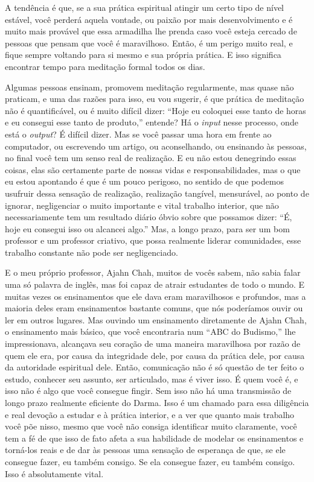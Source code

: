 A tendência é que, se a sua prática espiritual atingir um certo tipo
de nível estável, você perderá aquela vontade, ou paixão por mais
desenvolvimento e é muito mais provável que essa armadilha lhe prenda
caso você esteja cercado de pessoas que pensam que você é maravilhoso.
Então, é um perigo muito real, e fique sempre voltando para si mesmo e
sua própria prática. E isso significa encontrar tempo para meditação
formal todos os dias. 

Algumas pessoas ensinam, promovem meditação regularmente, mas quase
não praticam, e uma das razões para isso, eu vou sugerir, é que prática
de meditação não é quantificável, ou é muito difícil dizer: “Hoje eu
coloquei esse tanto de horas e eu consegui esse tanto de produto,”
entende? Há o \textit{input} nesse processo, onde está o
\textit{output}? É difícil dizer. Mas se você passar uma hora em frente
ao computador, ou escrevendo um artigo, ou aconselhando, ou ensinando
às pessoas, no final você tem um senso real de realização. E eu não
estou denegrindo essas coisas, elas são certamente parte de nossas
vidas e responsabilidades, mas o que eu estou apontando é que é um
pouco perigoso, no sentido de que podemos usufruir dessa sensação de
realização, realização tangível, mensurável, ao ponto de ignorar,
negligenciar o muito importante e vital trabalho interior, que não
necessariamente tem um resultado diário óbvio sobre que possamos dizer:
“É, hoje eu consegui isso ou alcancei algo.” Mas, a longo prazo, para
ser um bom professor e um professor criativo, que possa realmente
liderar comunidades, esse trabalho constante não pode ser
negligenciado. 

E o meu próprio professor, Ajahn Chah, muitos de vocês sabem, não
sabia falar uma só palavra de inglês, mas foi capaz de atrair
estudantes de todo o mundo. E muitas vezes os ensinamentos que ele dava
eram maravilhosos e profundos, mas a maioria deles eram ensinamentos
bastante comuns, que nós poderíamos ouvir ou ler em outros lugares. Mas
ouvindo um ensinamento diretamente de Ajahn Chah, o ensinamento mais
básico, que você encontraria num “ABC do Budismo,” lhe impressionava,
alcançava seu coração de uma maneira maravilhosa por razão de quem ele
era, por causa da integridade dele, por causa da prática dele, por
causa da autoridade espiritual dele. Então, comunicação não é só
questão de ter feito o estudo, conhecer seu assunto, ser articulado,
mas é viver isso. É quem você é, e isso não é algo que você consegue
fingir. Sem isso não há uma transmissão de longo prazo realmente
eficiente do Darma. Isso é um chamado para essa diligência e real
devoção a estudar e à prática interior, e a ver que quanto mais
trabalho você põe nisso, mesmo que você não consiga identificar muito
claramente, você tem a fé de que isso de fato afeta a sua habilidade de
modelar os ensinamentos e torná-los reais e de dar às pessoas uma
sensação de esperança de que, se ele consegue fazer, eu também consigo.
Se ela consegue fazer, eu também consigo. Isso é absolutamente vital. 

